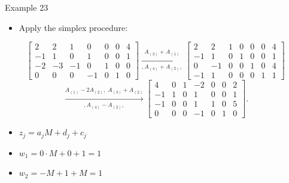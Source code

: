 \documentclass[aspectratio=169,hyperref,UTF8,CJK]{beamer}
\begin{document}
\begin{frame}{Example 23}
  \scriptsize
  \begin{itemize}
    \item Apply the simplex procedure:
  \end{itemize}
  \begin{equation*}
  \left[
  \begin{array}{rrrrrr|r}
   2& 2& 1& 0& 0&0&4\\
  -1& 1& 0& 1& 0&0&1\\
  -2&-3&-1& 0& 1&0&0\\
   0& 0& 0&-1& 0&1&0
  \end{array}\right]
  \xrightarrow[,A_{(4)}+A_{(2)},]{A_{(3)}+A_{(1)}}
  \left[
  \begin{array}{rrrrrr|r}
   2& 2&1&0&0&0&4\\
  -1& 1&0&1&0&0&1\\
   0&-1&0&0&1&0&4\\
  -1& 1&0&0&0&1&1
  \end{array}\right]
  \end{equation*}
  \begin{equation*}
  \xrightarrow[,A_{(4)}-A_{(2)},]{A_{(1)}-2A_{(2)},\;A_{(3)}+A_{(2)}}
  \left[
  \begin{array}{rrrrrr|r}
   4&0&1&-2&0&0&2\\
  -1&1&0& 1&0&0&1\\
  -1&0&0& 1&1&0&5\\
   0&0&0&-1&0&1&0
  \end{array}\right].
  \end{equation*}
  \begin{itemize}
    \item $z_j=a_jM+d_j+c_j$
    \item $w_1=0\cdot M+0+1=1$
    \item $w_2=-M+1+M=1$
  \end{itemize}
\end{frame}
\end{document}
